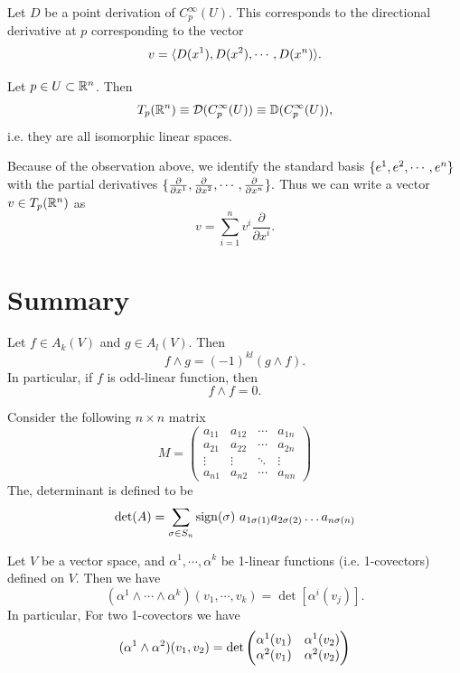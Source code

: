 \begin{observation}
	Let $ D $ be a point derivation of $ C_p^\infty (U) $. This corresponds to the directional derivative at $ p $ corresponding to the vector 
	\[ v = \langle D(x^1), D(x^2), \cdots, D(x^n) \rangle. \]
\end{observation}

\begin{observation}
	Let $ p \in U \subset \mathbb{R}^n $. Then 
	\[ T_p(\mathbb{R}^n) \equiv \mathcal{D}(C_p^\infty(U)) \equiv \mathbb{D}(C_p^\infty(U)), \]
	i.e. they are all isomorphic linear spaces.
\end{observation}

Because of the observation above, we identify the standard basis $ \{e^1, e^2, \cdots, e^n\} $ with the partial derivatives $ \{\frac{\partial}{\partial x^1}, \frac{\partial}{\partial x^2}, \cdots,\frac{\partial}{\partial x^n}\}. $ Thus we can write a vector $ v \in T_p(\mathbb{R}^n) $ as 
\[ v = \sum_{i=1}^{n} v^i \frac{\partial}{\partial x^i}. \]


\section{Summary}

\begin{summary}
	Let $ f \in A_k(V) $ and $ g \in A_l(V) $. Then
	\[ f\wedge g = (-1)^{kl}(g\wedge f). \]
	In particular, if $ f $ is odd-linear function, then 
	\[ f \wedge f = 0. \]
\end{summary}

\begin{summary}
	Consider the following $ n\times n $ matrix
	\[ 
	M = \begin{pmatrix}
		a_{11} & a_{12} & \cdots & a_{1n} \\
		a_{21} & a_{22} & \cdots & a_{2n} \\
		\vdots & \vdots & \ddots & \vdots \\
		a_{n1} & a_{n2} & \cdots & a_{nn}
	\end{pmatrix}
	 \]
	The, determinant is defined to be
	\[ \det(A) = \sum_{\sigma \in S_n} \operatorname{sign}(\sigma)\ a_{1\sigma(1)}a_{2\sigma(2)}\dots a_{n\sigma(n)} \]
\end{summary}

\begin{summary}
	Let $ V $ be a vector space, and $ \alpha^1,\cdots, \alpha^k $ be 1-linear functions (i.e. 1-covectors) defined on $ V $. Then we have
	\[ (\alpha^1  \wedge \cdots \wedge \alpha^k)(v_1,\cdots,v_k) = \det\left[ \alpha^i(v_j) \right]. \] 
	In particular, For two 1-covectors we have
	\[ (\alpha^1 \wedge \alpha^2)(v_1,v_2) = 
	\det \begin{pmatrix} \alpha^1(v_1) & \alpha^1(v_2) \\ \alpha^2(v_1) & \alpha^2(v_2) \end{pmatrix}
	 \]
\end{summary}

